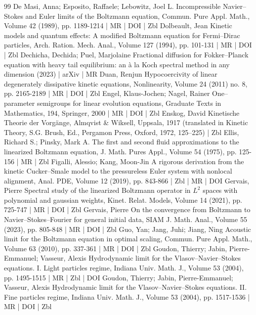 \documentclass[10pt]{amsart}
\theoremstyle{definition}\newtheorem{defi}[theo]{Definition}\newtheorem{rema}[theo]{Remark}\newtheorem{exam}[theo]{Example}\newtheorem{exem}[theo]{Example}\newtheorem{nota}[theo]{Notation}
\begin{document}
\begin{thebibliography}{99}
 De Masi, Anna; Esposito, Raffaele; Lebowitz, Joel L. Incompressible Navier–Stokes and Euler limits of the Boltzmann equation, Commun. Pure Appl. Math., Volume 42 (1989), pp. 1189-1214 | MR | DOI | Zbl
 Dolbeault, Jean Kinetic models and quantum effects: A modified Boltzmann equation for Fermi–Dirac particles, Arch. Ration. Mech. Anal., Volume 127 (1994), pp. 101-131 | MR | DOI | Zbl
 Dechicha, Dechida; Puel, Marjolaine Fractional diffusion for Fokker–Planck equation with heavy tail equilibrium: an à la Koch spectral method in any dimension (2023) | arXiv | MR
 Duan, Renjun Hypocoercivity of linear degenerately dissipative kinetic equations, Nonlinearity, Volume 24 (2011) no. 8, pp. 2165-2189 | MR | DOI | Zbl
 Engel, Klaus-Jochen; Nagel, Rainer One–parameter semigroups for linear evolution equations, Graduate Texts in Mathematics, 194, Springer, 2000 | MR | DOI | Zbl
 Enskog, David Kinetische Theorie der Vorgänge, Almqvist \& Wiksell, Uppsala, 1917 (translated in Kinetic Theory, S.G. Brush, Ed., Pergamon Press, Oxford, 1972, 125–225) | Zbl
 Ellis, Richard S.; Pinsky, Mark A. The first and second fluid approximations to the linearized Boltzmann equation, J. Math. Pures Appl., Volume 54 (1975), pp. 125-156 | MR | Zbl
 Figalli, Alessio; Kang, Moon-Jin A rigorous derivation from the kinetic Cucker–Smale model to the pressureless Euler system with nonlocal alignment, Anal. PDE, Volume 12 (2019), pp. 843-866 | Zbl | MR | DOI
 Gervais, Pierre Spectral study of the linearized Boltzmann operator in ${L}^2$ spaces with polynomial and gaussian weights, Kinet. Relat. Models, Volume 14 (2021), pp. 725-747 | MR | DOI | Zbl
 Gervais, Pierre On the convergence from Boltzmann to Navier–Stokes–Fourier for general initial data, SIAM J. Math. Anal., Volume 55 (2023), pp. 805-848 | MR | DOI | Zbl
 Guo, Yan; Jang, Juhi; Jiang, Ning Acoustic limit for the Boltzmann equation in optimal scaling, Commun. Pure Appl. Math., Volume 63 (2010), pp. 337-361 | MR | DOI | Zbl
 Goudon, Thierry; Jabin, Pierre-Emmanuel; Vasseur, Alexis Hydrodynamic limit for the Vlasov–Navier–Stokes equations. I. Light particles regime, Indiana Univ. Math. J., Volume 53 (2004), pp. 1495-1515 | MR | Zbl | DOI
 Goudon, Thierry; Jabin, Pierre-Emmanuel; Vasseur, Alexis Hydrodynamic limit for the Vlasov–Navier–Stokes equations. II. Fine particles regime, Indiana Univ. Math. J., Volume 53 (2004), pp. 1517-1536 | MR | DOI | Zbl

\end{thebibliography}
\end{document}
